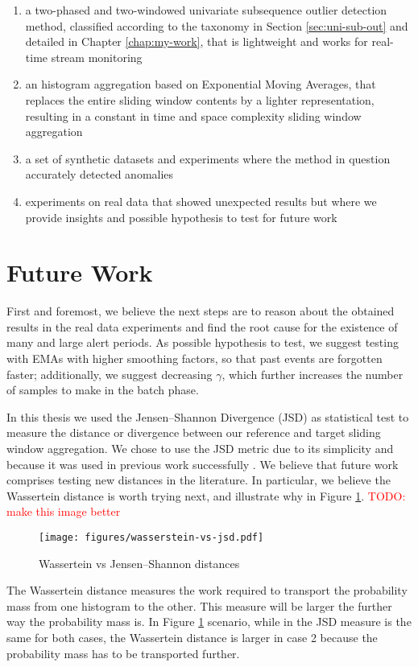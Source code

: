\begin{enumerate}
    \item a two-phased and two-windowed univariate subsequence outlier detection method, classified according to the taxonomy in Section \ref{sec:uni-sub-out} and detailed in Chapter \ref{chap:my-work}, that is lightweight and works for real-time stream monitoring
    
    \item an histogram aggregation based on Exponential Moving Averages, that replaces the entire sliding window contents by a lighter representation, resulting in a constant in time and space complexity sliding window aggregation
    
    \item a set of synthetic datasets and experiments where the method in question accurately detected anomalies
    
    \item experiments on real data that showed unexpected results but where we provide insights and possible hypothesis to test for future work
\end{enumerate}

\section{Future Work}

First and foremost, we believe the next steps are to reason about the obtained results in the real data experiments and find the root cause for the existence of many and large alert periods. As possible hypothesis to test, we suggest testing with EMAs with higher smoothing factors, so that past events are forgotten faster; additionally, we suggest decreasing $\gamma$, which further increases the number of samples to make in the batch phase.

In this thesis we used the Jensen–Shannon Divergence (JSD) as statistical test to measure the distance or divergence between our reference and target sliding window aggregation. We chose to use the JSD metric due to its simplicity and because it was used in previous work successfully \cite{SAMM}. We believe that future work comprises testing new distances in the literature. In particular, we believe the Wassertein distance is worth trying next, and illustrate why in Figure \ref{fig:wasserteinvsjsd}.
\textcolor{red}{TODO: make this image better}
\begin{figure}[!htb]
    \begin{center}
      \texttt{[image: figures/wasserstein-vs-jsd.pdf]}
      \caption{Wassertein vs Jensen–Shannon distances}
      \label{fig:wasserteinvsjsd}
    \end{center}
\end{figure}
The Wassertein distance measures the work required to transport the probability mass from one histogram to the other. This measure will be larger the further way the probability mass is. In Figure \ref{fig:wasserteinvsjsd} scenario, while in the JSD measure is the same for both cases, the Wassertein distance is larger in case 2 because the probability mass has to be transported further.

